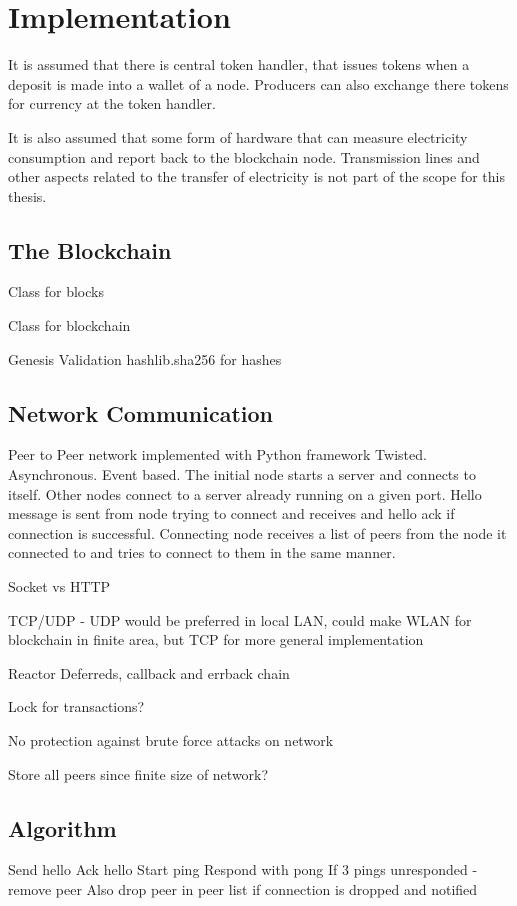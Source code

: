 \chapter{Implementation}
It is assumed that there is central token handler, that issues tokens when a deposit is made into a wallet of a node. Producers can also exchange there tokens for currency at the token handler.

It is also assumed that some form of hardware that can measure electricity consumption and report back to the blockchain node. Transmission lines and other aspects related to the transfer of electricity is not part of the scope for this thesis.

\section{The Blockchain}
Class for blocks

Class for blockchain

Genesis
Validation
hashlib.sha256 for hashes 

\section{Network Communication}
Peer to Peer network implemented with Python framework Twisted. Asynchronous. Event based. The initial node starts a server and connects to itself. Other nodes connect to a server already running on a given port. Hello message is sent from node trying to connect and receives and hello ack if connection is successful. Connecting node receives a list of peers from the node it connected to and tries to connect to them in the same manner.


Socket vs HTTP

TCP/UDP - UDP would be preferred in local LAN, could make WLAN for blockchain in 
finite area, but TCP for more general implementation 



Reactor
Deferreds, callback and errback chain


Lock for transactions?

No protection against brute force attacks on network

Store all peers since finite size of network?
\section{Algorithm} %
Send hello
Ack hello
Start ping
Respond with pong
If 3 pings unresponded - remove peer
Also drop peer in peer list if connection is dropped and notified

